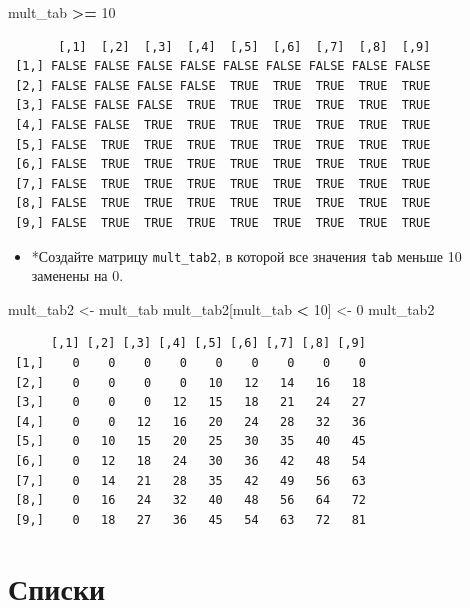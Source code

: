 \documentclass[
]{book}
\newenvironment{Shaded}{\begin{snugshade}}{\end{snugshade}}
\newcommand{\DecValTok}[1]{\textcolor[rgb]{0.00,0.00,0.81}{#1}}
\newcommand{\NormalTok}[1]{#1}
\newcommand{\OperatorTok}[1]{\textcolor[rgb]{0.81,0.36,0.00}{\textbf{#1}}}
\newcommand{\StringTok}[1]{\textcolor[rgb]{0.31,0.60,0.02}{#1}}
\providecommand{\tightlist}{%
  \setlength{\itemsep}{0pt}\setlength{\parskip}{0pt}}
\begin{document}
\begin{Shaded}
\begin{Highlighting}[]
\NormalTok{mult_tab }\OperatorTok{>=}\StringTok{ }\DecValTok{10}
\end{Highlighting}
\end{Shaded}

\begin{verbatim}
       [,1]  [,2]  [,3]  [,4]  [,5]  [,6]  [,7]  [,8]  [,9]
 [1,] FALSE FALSE FALSE FALSE FALSE FALSE FALSE FALSE FALSE
 [2,] FALSE FALSE FALSE FALSE  TRUE  TRUE  TRUE  TRUE  TRUE
 [3,] FALSE FALSE FALSE  TRUE  TRUE  TRUE  TRUE  TRUE  TRUE
 [4,] FALSE FALSE  TRUE  TRUE  TRUE  TRUE  TRUE  TRUE  TRUE
 [5,] FALSE  TRUE  TRUE  TRUE  TRUE  TRUE  TRUE  TRUE  TRUE
 [6,] FALSE  TRUE  TRUE  TRUE  TRUE  TRUE  TRUE  TRUE  TRUE
 [7,] FALSE  TRUE  TRUE  TRUE  TRUE  TRUE  TRUE  TRUE  TRUE
 [8,] FALSE  TRUE  TRUE  TRUE  TRUE  TRUE  TRUE  TRUE  TRUE
 [9,] FALSE  TRUE  TRUE  TRUE  TRUE  TRUE  TRUE  TRUE  TRUE
\end{verbatim}

\begin{itemize}
\tightlist
\item
  *Создайте матрицу \texttt{mult\_tab2}, в которой все значения \texttt{tab} меньше 10 заменены на 0.
\end{itemize}

\begin{Shaded}
\begin{Highlighting}[]
\NormalTok{mult_tab2 <-}\StringTok{ }\NormalTok{mult_tab}
\NormalTok{mult_tab2[mult_tab }\OperatorTok{<}\StringTok{ }\DecValTok{10}\NormalTok{] <-}\StringTok{ }\DecValTok{0}
\NormalTok{mult_tab2}
\end{Highlighting}
\end{Shaded}

\begin{verbatim}
      [,1] [,2] [,3] [,4] [,5] [,6] [,7] [,8] [,9]
 [1,]    0    0    0    0    0    0    0    0    0
 [2,]    0    0    0    0   10   12   14   16   18
 [3,]    0    0    0   12   15   18   21   24   27
 [4,]    0    0   12   16   20   24   28   32   36
 [5,]    0   10   15   20   25   30   35   40   45
 [6,]    0   12   18   24   30   36   42   48   54
 [7,]    0   14   21   28   35   42   49   56   63
 [8,]    0   16   24   32   40   48   56   64   72
 [9,]    0   18   27   36   45   54   63   72   81
\end{verbatim}

\hypertarget{solution_list}{%
\section{Списки}\label{solution_list}}
\end{document}

